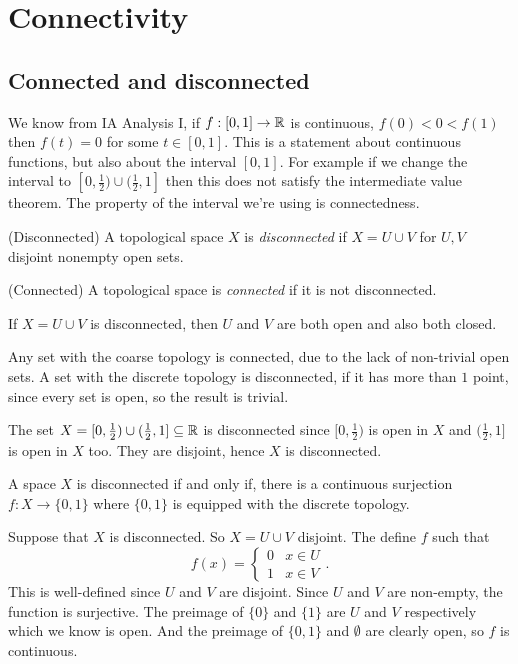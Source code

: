 \documentclass{article}
\begin{document}
\section{Connectivity}
\subsection{Connected and disconnected}
We know from IA Analysis I, if $ f:[0,1]\to \mathbb{R} $ is continuous, $ f(0)<0<f(1) $ then $ f(t) = 0 $ for some $ t\in [0,1] $. This is a statement about continuous functions, but also about the interval $ [0,1] $. For example if we change the interval to $ [0,\frac 12) \cup(\frac 12, 1] $ then this does not satisfy the intermediate value theorem. The property of the interval we're using is connectedness.
\begin{definition}
	(Disconnected) A topological space $ X $ is \textit{disconnected} if $ X = U \cup V $ for $ U,V $ disjoint nonempty open sets.
\end{definition}
\begin{definition}
	(Connected) A topological space is \textit{connected} if it is not disconnected.
\end{definition}
If $ X = U\cup V $ is disconnected, then $ U $ and $ V $ are both open and also both closed.\par
Any set with the coarse topology is connected, due to the lack of non-trivial open sets. A set with the discrete topology is disconnected, if it has more than $ 1 $ point, since every set is open, so the result is trivial.\par
The set $ X = [0,\frac 12) \cup (\frac 12 ,1] \subseteq \mathbb{R} $ is disconnected since $ [0,\frac 12) $ is open in $ X $ and $ (\frac 12, 1] $ is open in $ X $ too. They are disjoint, hence $ X $ is disconnected.
\begin{proposition}
	A space $ X $ is disconnected if and only if, there is a continuous surjection $ f:X\to \{0,1\} $ where $ \{0,1\} $ is equipped with the discrete topology.
\end{proposition}
\pf Suppose that $ X $ is disconnected. So $ X = U\cup V $ disjoint. The define $ f$ such that
\[
  f(x) = \begin{cases}
	  0 & x\in U \\
	  1 & x\in V
  \end{cases}.
\]
This is well-defined since $ U $ and $ V $ are disjoint. Since $ U $ and $ V $ are non-empty, the function is surjective. The preimage of $ \{0\} $ and $ \{1\} $ are $ U $ and $ V $ respectively which we know is open. And the preimage of $ \{0,1\} $ and $ \emptyset $ are clearly open, so $ f $ is continuous.\par
\end{document}
